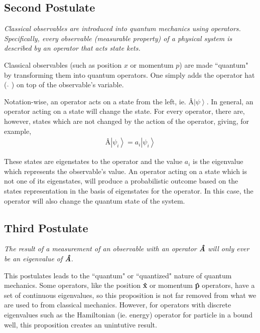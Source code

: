 \documentclass[11pt]{article} %
\newcommand{\ket}[1]{\left|#1\right\rangle}
\begin{document}
\subsection{Second Postulate}
\begin{center}
    \textit{Classical observables are introduced into quantum mechanics using operators. Specifically, every observable (measurable property) of a physical system is described by an operator that acts state kets.}
\end{center}

Classical observables (such as position $x$ or momentum $p$) are made ``quantum" by transforming them into quantum operators. One simply adds the operator hat ( $\hat{ }$ ) on top of the observable's variable.

Notation-wise, an operator acts on a state from the left, ie. $\textrm{\^A}\ket{\psi}$. In general, an operator acting on a state will change the state. For every operator, there are, however, states which are not changed by the action of the operator, giving, for example,
\begin{align}
\textbf{\^A}\ket{\psi_i} = a_i\ket{\psi_i}
\end{align}

\noindent These states are eigenstates to the operator and the value $a_i$ is the eigenvalue which represents the observable's value. An operator acting on a state which is not one of its eigenstates, will produce a probabilistic outcome based on the states representation in the basis of eigenstates for the operator. In this case, the operator will also change the quantum state of the system.

\subsection{Third Postulate} \label{third_pos}
\begin{center}
    \textit{The result of a measurement of an observable with an operator \textbf{\^A} will only ever be an eigenvalue of \textbf{\^A}.}
\end{center}

This postulates leads to the ``quantum" or ``quantized" nature of quantum mechanics. Some operators, like the position \textbf{\^x} or momentum \textbf{\^p} operators, have a set of continuous eigenvalues, so this proposition is not far removed from what we are used to from classical mechanics. However, for operators with discrete eigenvalues such as the Hamiltonian (ie. energy) operator for particle in a bound well, this proposition creates an unintutive result.
\end{document}
